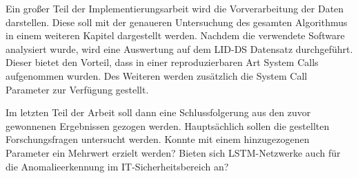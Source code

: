Ein großer Teil der Implementierungsarbeit wird die Vorverarbeitung der Daten darstellen.
Diese soll mit der genaueren Untersuchung des gesamten Algorithmus in einem weiteren Kapitel dargestellt werden.
Nachdem die verwendete Software analysiert wurde, wird eine Auswertung auf dem LID-DS \cite{LID-DS} Datensatz durchgeführt.
Dieser bietet den Vorteil, dass in einer reproduzierbaren Art System Calls aufgenommen wurden.
Des Weiteren werden zusätzlich die System Call Parameter zur Verfügung gestellt.

Im letzten Teil der Arbeit soll dann eine Schlussfolgerung aus den zuvor gewonnenen Ergebnissen gezogen werden. 
Hauptsächlich sollen die gestellten Forschungsfragen untersucht werden.
Konnte mit einem hinzugezogenen Parameter ein Mehrwert erzielt werden?
Bieten sich LSTM-Netzwerke auch für die Anomalieerkennung im IT-Sicherheitsbereich an?
